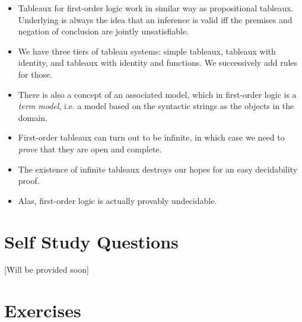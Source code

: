 \begin{itemize}
	
		\item Tableaux for first-order logic work in similar way as propositional tableaux. Underlying is always the idea that an inference is valid iff the premises and negation of conclusion are jointly unsatisfiable.				
		\item We have three tiers of tableau systems: simple tableaux, tableaux with identity, and tableaux with identity and functions. We successively add rules for those.
		
		\item There is also a concept of an associated model, which in first-order logic is a \emph{term model}, i.e. a model based on the syntactic strings as the objects in the domain.
		
		\item First-order tableaux can turn out to be infinite, in which case we need to \emph{prove} that they are open and complete.
		
		\item The existence of infinite tableaux destroys our hopes for an easy decidability proof.
		
		\item Alas, first-order logic is actually provably undecidable.
	
	\end{itemize}


\section{Self Study Questions}

[Will be provided soon]

\section{Exercises}
	
